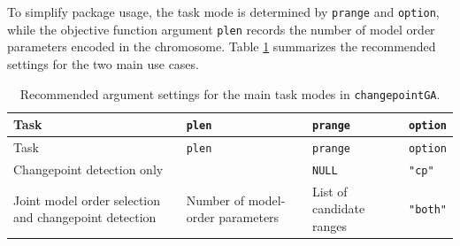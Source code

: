 To simplify package usage, the task mode is determined by \texttt{prange} and \texttt{option}, while the objective function argument \texttt{plen} records the number of model order parameters encoded in the chromosome. Table \ref{tab:taskmode} summarizes the recommended settings for the two main use cases.

\begin{longtable}[]{@{}
  >{\raggedright\arraybackslash}p{}
  >{\raggedright\arraybackslash}p{}
  >{\raggedright\arraybackslash}p{}
  >{\raggedright\arraybackslash}p{}@{}}
\caption{\label{tab:taskmode} Recommended argument settings for the main task modes in \protect\texttt{changepointGA}.}\tabularnewline
\toprule\noalign{}
\begin{minipage}[b]{\linewidth}\raggedright
Task
\end{minipage} & \begin{minipage}[b]{\linewidth}\raggedright
\texttt{plen}
\end{minipage} & \begin{minipage}[b]{\linewidth}\raggedright
\texttt{prange}
\end{minipage} & \begin{minipage}[b]{\linewidth}\raggedright
\texttt{option}
\end{minipage} \\
\midrule\noalign{}
\endfirsthead
\toprule\noalign{}
\begin{minipage}[b]{\linewidth}\raggedright
Task
\end{minipage} & \begin{minipage}[b]{\linewidth}\raggedright
\texttt{plen}
\end{minipage} & \begin{minipage}[b]{\linewidth}\raggedright
\texttt{prange}
\end{minipage} & \begin{minipage}[b]{\linewidth}\raggedright
\texttt{option}
\end{minipage} \\
\midrule\noalign{}
\endhead
\bottomrule\noalign{}
\endlastfoot
Changepoint detection only & 0 & \texttt{NULL} & \texttt{"cp"} \\
Joint model order selection and changepoint detection & Number of model-order parameters & List of candidate ranges & \texttt{"both"} \\
\end{longtable}

